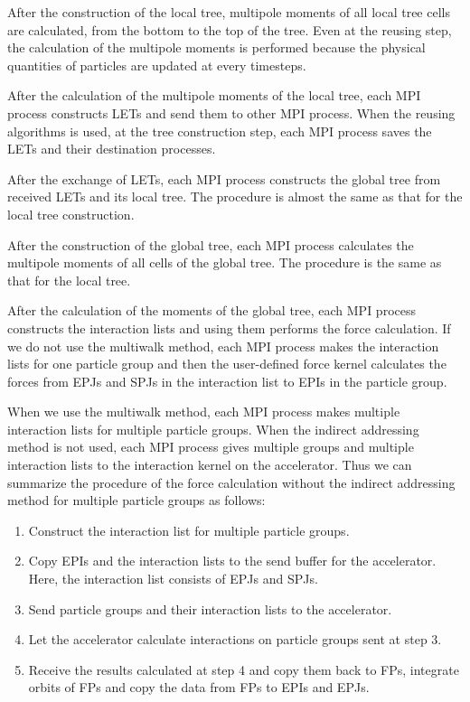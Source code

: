 \documentclass[dvipdfmx]{pasj01}
\begin{document}
After the construction of the local tree, multipole moments of all
local tree cells are calculated, from the bottom to the top of the
tree. Even at the reusing step, the calculation of the multipole
moments is performed because the physical quantities of particles are
updated at every timesteps.

After the calculation of the multipole moments of the local tree, each
MPI process constructs LETs and send them to other MPI process. When
the reusing algorithms is used, at the tree construction step, each
MPI process saves the LETs and their destination processes.

After the exchange of LETs, each MPI process constructs the global
tree from received LETs and its local tree. The procedure is almost
the same as that for the local tree construction.

After the construction of the global tree, each MPI process calculates
the multipole moments of all cells of the global tree. The procedure
is the same as that for the local tree.

After the calculation of the moments of the global tree, each MPI
process constructs the interaction lists and using them performs the
force calculation. If we do not use the multiwalk method, each MPI
process makes the interaction lists for one particle group and then
the user-defined force kernel calculates the forces from EPJs and SPJs
in the interaction list to EPIs in the particle group.

When we use the multiwalk method, each MPI process makes multiple
interaction lists for multiple particle groups. When the indirect
addressing method is not used, each MPI process gives multiple groups
and multiple interaction lists to the interaction kernel on the
accelerator. Thus we can summarize the procedure of the force
calculation without the indirect addressing method for multiple
particle groups as follows:
\begin{enumerate}
\item Construct the interaction list for multiple particle groups.
\item Copy EPIs and the interaction lists to the send buffer for the
  accelerator. Here, the interaction list consists of EPJs and SPJs.
\item Send particle groups and their interaction lists to the accelerator.
\item Let the accelerator calculate interactions on particle groups
  sent at step 3.
\item Receive the results calculated at step 4 and copy them back to
  FPs, integrate orbits of FPs and copy the data from FPs to EPIs and
  EPJs.
\end{enumerate}
\end{document}
